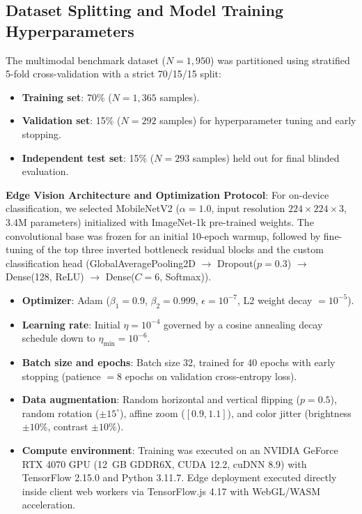 \documentclass[conference]{IEEEtran}
\begin{document}
\subsection{Dataset Splitting and Model Training Hyperparameters}
The multimodal benchmark dataset ($N = 1,950$) was partitioned using stratified 5-fold cross-validation with a strict 70/15/15 split:
\begin{itemize}
    \item \textbf{Training set}: 70\% ($N = 1,365$ samples).
    \item \textbf{Validation set}: 15\% ($N = 292$ samples) for hyperparameter tuning and early stopping.
    \item \textbf{Independent test set}: 15\% ($N = 293$ samples) held out for final blinded evaluation.
\end{itemize}

\textbf{Edge Vision Architecture and Optimization Protocol}:
For on-device classification, we selected MobileNetV2 ($\alpha = 1.0$, input resolution $224 \times 224 \times 3$, 3.4M parameters) initialized with ImageNet-1k pre-trained weights. The convolutional base was frozen for an initial 10-epoch warmup, followed by fine-tuning of the top three inverted bottleneck residual blocks and the custom classification head (GlobalAveragePooling2D $\to$ Dropout($p = 0.3$) $\to$ Dense(128, ReLU) $\to$ Dense($C=6$, Softmax)).
\begin{itemize}
    \item \textbf{Optimizer}: Adam ($\beta_1 = 0.9$, $\beta_2 = 0.999$, $\epsilon = 10^{-7}$, L2 weight decay $= 10^{-5}$).
    \item \textbf{Learning rate}: Initial $\eta = 10^{-4}$ governed by a cosine annealing decay schedule down to $\eta_{\min} = 10^{-6}$.
    \item \textbf{Batch size and epochs}: Batch size 32, trained for 40 epochs with early stopping (patience $= 8$ epochs on validation cross-entropy loss).
    \item \textbf{Data augmentation}: Random horizontal and vertical flipping ($p = 0.5$), random rotation ($\pm 15^\circ$), affine zoom ($[0.9, 1.1]$), and color jitter (brightness $\pm 10\%$, contrast $\pm 10\%$).
    \item \textbf{Compute environment}: Training was executed on an NVIDIA GeForce RTX 4070 GPU (12~GB GDDR6X, CUDA 12.2, cuDNN 8.9) with TensorFlow 2.15.0 and Python 3.11.7. Edge deployment executed directly inside client web workers via TensorFlow.js 4.17 with WebGL/WASM acceleration.
\end{itemize}
\end{document}

